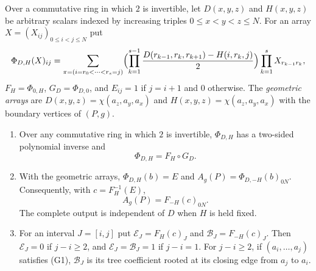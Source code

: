 \begin{definition}\label{def:nearfar}\leanok
Over a commutative ring in which $2$ is invertible, let $D(x,y,z)$ and
$H(x,y,z)$ be arbitrary scalars indexed by increasing triples
$0\leq x<y<z\leq N$. For an array $X=(X_{ij})_{0\leq i<j\leq N}$ put
\[
\Phi_{D,H}(X)_{ij}=\sum_{\pi=(i=r_0<\cdots<r_s=j)}
\Bigl(\prod_{k=1}^{s-1}\frac{D(r_{k-1},r_k,r_{k+1})-H(i,r_k,j)}2\Bigr)
\prod_{k=1}^sX_{r_{k-1}r_k},
\]
$F_H=\Phi_{0,H}$, $G_D=\Phi_{D,0}$, and $E_{ij}=1$ if $j=i+1$ and $0$
otherwise. The \emph{geometric arrays} are $D(x,y,z)=\chi(a_z,a_y,a_x)$ and
$H(x,y,z)=\chi(a_z,a_y,a_x)$ with the boundary vertices of $(P,g)$.
\end{definition}

\begin{lemma}\label{lem:farout}\leanok
\begin{enumerate}
\item[(i)] Over any commutative ring in which $2$ is invertible,
$\Phi_{D,H}$ has a two-sided polynomial inverse and
\begin{equation}\label{afr:factor}
\Phi_{D,H}=F_H\circ G_D.
\end{equation}
\item[(ii)] With the geometric arrays, $\Phi_{D,H}(b)=E$ and
$A_g(P)=\Phi_{D,-H}(b)_{0N}$. Consequently, with $c=F_H^{-1}(E)$,
\begin{equation}\label{afr:far-output}
A_g(P)=F_{-H}(c)_{0N}.
\end{equation}
The complete output is independent of $D$ when $H$ is held fixed.
\item[(iii)] For an interval $J=[i,j]$ put
$\mathcal E_J=F_H(c)_J$ and $\mathcal B_J=F_{-H}(c)_J$.
Then $\mathcal E_J=0$ if $j-i\geq2$, and
$\mathcal E_J=\mathcal B_J=1$ if $j-i=1$.
For $j-i\geq2$, if $(a_i,\ldots,a_j)$ satisfies (G1),
$\mathcal B_J$ is its tree coefficient rooted at its closing edge
from $a_j$ to $a_i$.
\end{enumerate}

\end{lemma}
